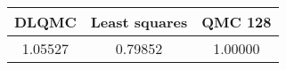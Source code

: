 \begin{tabular}{|c|c|c|}
\hline
DLQMC&Least squares&QMC 128\\ 
\hline

1.05527 & 0.79852 & 1.00000\\ 
\hline
\end{tabular}

